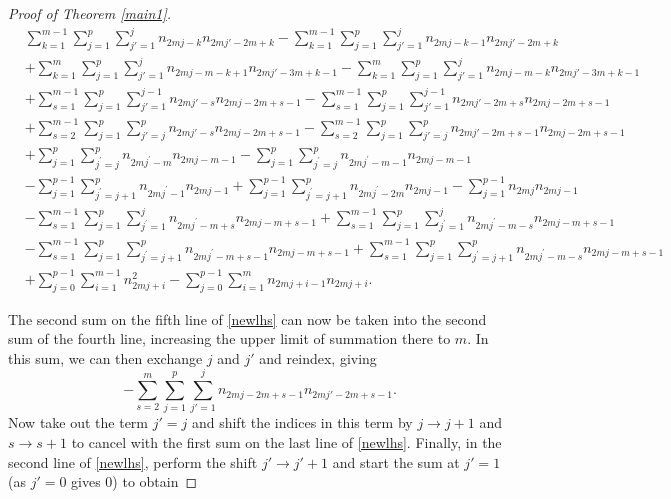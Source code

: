 \documentclass[11pt,reqno]{amsart}
\theoremstyle{definition}
\numberwithin{equation}{section}
\begin{document}
\begin{proof}[Proof of Theorem \ref{main1}]
\begin{equation}  \label{newlhs}
\begin{aligned}
& \sum_{k=1}^{m-1} \sum_{j=1}^{p} \sum_{j'=1}^{j} n_{2mj-k} n_{2mj' - 2m + k} - \sum_{k=1}^{m-1} \sum_{j=1}^{p} \sum_{j'=1}^{j} n_{2mj-k-1} n_{2mj' - 2m + k} \\
& + \sum_{k=1}^{m} \sum_{j=1}^{p} \sum_{j'=1}^{j} n_{2mj-m-k+1}n_{2mj'-3m+k-1} - \sum_{k=1}^{m} \sum_{j=1}^{p} \sum_{j'=1}^{j} n_{2mj-m-k} n_{2mj'-3m+k-1} \\
& + \sum_{s=1}^{m-1} \sum_{j=1}^{p} \sum_{j'=1}^{j-1} n_{2mj'-s}n_{2mj-2m+s-1} - \sum_{s=1}^{m-1} \sum_{j=1}^{p} \sum_{j'=1}^{j-1} n_{2mj'-2m+s} n_{2mj-2m+s-1} \\
& + \sum_{s=2}^{m-1} \sum_{j=1}^{p} \sum_{j'=j}^{p} n_{2mj'-s} n_{2mj-2m + s-1} - \sum_{s=2}^{m-1} \sum_{j=1}^{p} \sum_{j'=j}^{p} n_{2mj'-2m + s-1}  n_{2mj-2m + s-1} \\
& + \sum_{j=1}^{p}  \sum_{j^{\prime}=j}^{p} n_{2mj^{\prime} - m}n_{2mj - m - 1} - \sum_{j=1}^{p}  \sum_{j^{\prime}=j}^{p} n_{2mj^{\prime} - m -1}  n_{2mj - m - 1} \\
& - \sum_{j=1}^{p - 1} \sum_{j^{\prime} = j+1}^{p} n_{2mj^{\prime} - 1}n_{2mj - 1} + \sum_{j=1}^{p - 1} \sum_{j^{\prime} = j+1}^{p} n_{2mj^{\prime} - 2m}n_{2mj - 1} -  \sum_{j=1}^{p - 1}n_{2mj} n_{2mj - 1} \\
& - \sum_{s=1}^{m-1} \sum_{j=1}^{p}  \sum_{j^{\prime}=1}^{j} n_{2mj^{\prime} - m + s}n_{2mj - m + s - 1} +  \sum_{s=1}^{m-1} \sum_{j=1}^{p}  \sum_{j^{\prime}=1}^{j} n_{2mj^{\prime} - m - s}n_{2mj - m + s - 1}  \\
&-  \sum_{s=1}^{m-1} \sum_{j=1}^{p}\sum_{j^{\prime}=j+1}^{p} n_{2mj^{\prime} - m + s-1}n_{2mj - m + s - 1} + \sum_{s=1}^{m-1} \sum_{j=1}^{p}\sum_{j^{\prime}=j+1}^{p}n_{2mj^{\prime} - m - s} n_{2mj - m + s - 1} \\
& + \sum_{j=0}^{p-1} \sum_{i=1}^{m-1} n_{2mj+i}^2 - \sum_{j=0}^{p-1} \sum_{i=1}^{m} n_{2mj+i-1}n_{2mj+i}.
\end{aligned}
\end{equation}

\noindent The second sum on the fifth line of \eqref{newlhs} can now be taken into the second sum of the fourth line, increasing the upper limit of summation there to $m$.  In this sum, we can then exchange $j$ and $j'$ and reindex, giving
\begin{equation*}
-\sum_{s=2}^{m} \sum_{j=1}^{p} \sum_{j'=1}^{j} n_{2mj-2m + s-1}  n_{2mj'-2m + s-1}.
\end{equation*}
Now take out the term $j' = j$ and shift the indices in this term by $j \to j+1$ and $s \to s+1$ to cancel with the first sum on the last line  of \eqref{newlhs}. Finally, in the second line of \eqref{newlhs}, perform the shift $j' \to j'+1$ and start the sum at $j'=1$ (as $j'=0$ gives 0) to obtain


\end{proof}
\end{document}
